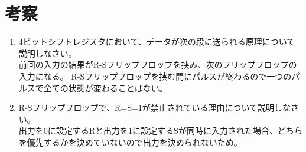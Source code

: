 \documentclass[dvipdfmx, a4paper]{jsarticle}
\begin{document}
	\section{考察}
		\begin{enumerate}
			\item 4ビットシフトレジスタにおいて、データが次の段に送られる原理について説明しなさい。\\
				前回の入力の結果がR-Sフリップフロップを挟み、次のフリップフロップの入力になる。
				R-Sフリップフロップを挟む間にパルスが終わるので一つのパルスで全ての状態が変わることはない。
			\item R-Sフリップフロップで、R=S=1が禁止されている理由について説明しなさい。\\
				出力を0に設定するRと出力を1に設定するSが同時に入力された場合、どちらを優先するかを決めていないので出力を決められないため。
		\end{enumerate}
\end{document}
